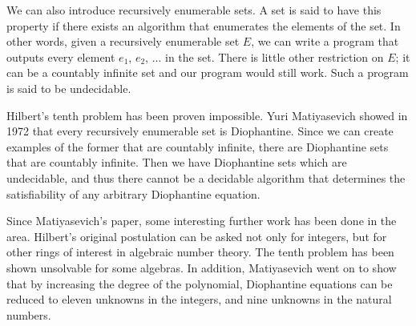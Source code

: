 \documentclass[12pt]{amsart}
\theoremstyle{case}
\begin{document}
	We can also introduce recursively enumerable sets. A set is said to have this property if there exists an algorithm that enumerates the elements of the set. In other words, given a recursively enumerable set $E$, we can write a program that outputs every element $e_1$, $e_2$, ... in the set. There is little other restriction on $E$; it can be a countably infinite set and our program would still work. Such a program is said to be undecidable.
	
	Hilbert's tenth problem has been proven impossible. Yuri Matiyasevich showed in 1972 that every recursively enumerable set is Diophantine. Since we can create examples of the former that are countably infinite, there are Diophantine sets that are countably infinite. Then we have Diophantine sets which are undecidable, and thus there cannot be a decidable algorithm that determines the satisfiability of any arbitrary Diophantine equation.
	
	Since Matiyasevich's paper, some interesting further work has been done in the area. Hilbert's original postulation can be asked not only for integers, but for other rings of interest in algebraic number theory. The tenth problem has been shown unsolvable for some algebras. In addition, Matiyasevich went on to show that by increasing the degree of the polynomial, Diophantine equations can be reduced to eleven unknowns in the integers, and nine unknowns in the natural numbers.
	
	
	
	
\end{document}
